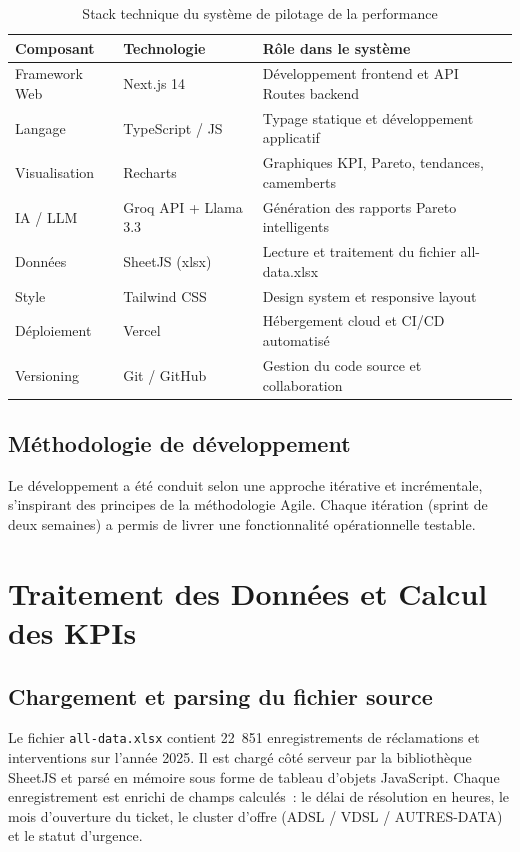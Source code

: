\documentclass[11pt,a4paper]{report}
\begin{document}
\begin{table}[h!]
\centering
\caption{Stack technique du système de pilotage de la performance}
\begin{tabularx}{\textwidth}{L{3.5cm} L{4cm} X}
\toprule
\textbf{Composant} & \textbf{Technologie} & \textbf{Rôle dans le système} \\
\midrule
Framework Web  & Next.js 14           & Développement frontend et API Routes backend \\
Langage        & TypeScript / JS      & Typage statique et développement applicatif \\
Visualisation  & Recharts             & Graphiques KPI, Pareto, tendances, camemberts \\
IA / LLM       & Groq API + Llama 3.3 & Génération des rapports Pareto intelligents \\
Données        & SheetJS (xlsx)       & Lecture et traitement du fichier all-data.xlsx \\
Style          & Tailwind CSS         & Design system et responsive layout \\
Déploiement    & Vercel               & Hébergement cloud et CI/CD automatisé \\
Versioning     & Git / GitHub         & Gestion du code source et collaboration \\
\bottomrule
\end{tabularx}
\label{tab:stack}
\end{table}

\subsection{Méthodologie de développement}

Le développement a été conduit selon une approche itérative et incrémentale, s'inspirant des principes de la méthodologie Agile. Chaque itération (sprint de deux semaines) a permis de livrer une fonctionnalité opérationnelle testable.

\section{Traitement des Données et Calcul des KPIs}

\subsection{Chargement et parsing du fichier source}

Le fichier \texttt{all-data.xlsx} contient 22~851 enregistrements de réclamations et interventions sur l'année 2025. Il est chargé côté serveur par la bibliothèque SheetJS et parsé en mémoire sous forme de tableau d'objets JavaScript. Chaque enregistrement est enrichi de champs calculés~: le délai de résolution en heures, le mois d'ouverture du ticket, le cluster d'offre (ADSL / VDSL / AUTRES-DATA) et le statut d'urgence.
\end{document}
